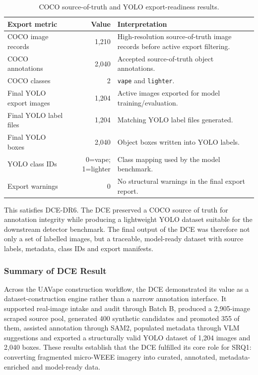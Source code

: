 \begin{table}[H]
\centering
\small
\renewcommand{\arraystretch}{1.2}
\begin{tabularx}{\textwidth}{p{} r X}
\toprule
\textbf{Export metric} & \textbf{Value} & \textbf{Interpretation} \\
\midrule
COCO image records & 1,210 & High-resolution source-of-truth image records before active export filtering. \\
COCO annotations & 2,040 & Accepted source-of-truth object annotations. \\
COCO classes & 2 & \texttt{vape} and \texttt{lighter}. \\
Final YOLO export images & 1,204 & Active images exported for model training/evaluation. \\
Final YOLO label files & 1,204 & Matching YOLO label files generated. \\
Final YOLO boxes & 2,040 & Object boxes written into YOLO labels. \\
YOLO class IDs & 0=vape; 1=lighter & Class mapping used by the model benchmark. \\
Export warnings & 0 & No structural warnings in the final export report. \\
\bottomrule
\end{tabularx}
\caption{COCO source-of-truth and YOLO export-readiness results.}
\label{tab:dce_results_export}
\end{table}

This satisfies DCE-DR6. The DCE preserved a COCO source of truth for annotation integrity while producing a lightweight YOLO dataset suitable for the downstream detector benchmark. The final output of the DCE was therefore not only a set of labelled images, but a traceable, model-ready dataset with source labels, metadata, class IDs and export manifests.

\subsubsection{Summary of DCE Result}

Across the UAVape construction workflow, the DCE demonstrated its value as a dataset-construction engine rather than a narrow annotation interface. It supported real-image intake and audit through Batch B, produced a 2,905-image scraped source pool, generated 400 synthetic candidates and promoted 355 of them, assisted annotation through SAM2, populated metadata through VLM suggestions and exported a structurally valid YOLO dataset of 1,204 images and 2,040 boxes. These results establish that the DCE fulfilled its core role for SRQ1: converting fragmented micro-WEEE imagery into curated, annotated, metadata-enriched and model-ready data.
